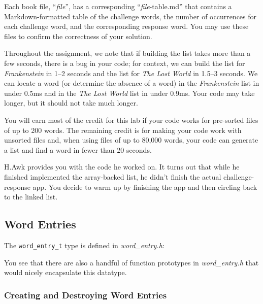 Each book file, ``\textit{file}'', has a corresponding ``\textit{file}-table.md'' that contains a Markdown-formatted table of the challenge words, the number of occurrences for each challenge word, and the corresponding response word.
You may use these files to confirm the correctness of your solution.


Throughout the assignment, we note that if building the list takes more than a few seconds, there is a bug in your code;
for context, we can build the list for \textit{Frankenstein} in 1--2 seconds and the list for \textit{The Lost World} in 1.5--3 seconds.
We can locate a word (or determine the absence of a word) in the \textit{Frankenstein} list in under 0.5ms and in the \textit{The Lost World} list in under 0.9ms.
Your code may take longer, but it should not take much longer.


You will earn most of the credit for this lab if your code works for pre-sorted files of up to 200 words.
The remaining credit is for making your code work with unsorted files and, when using files of up to 80,000 words, your code can generate a list and find a word in fewer than 20 seconds.

\vspace{1cm}

H.Awk provides you with the code he worked on.
It turns out that while he finished implemented the array-backed list, he didn't finish the actual challenge-response app.
You decide to warm up by finishing the app and then circling back to the linked list.

\subsection{Word Entries}

The \lstinline{word_entry_t} type is defined in \textit{word\_entry.h}:



You see that there are also a handful of function prototypes in \textit{word\_entry.h} that would nicely encapsulate this datatype.

\subsubsection{Creating and Destroying Word Entries}

